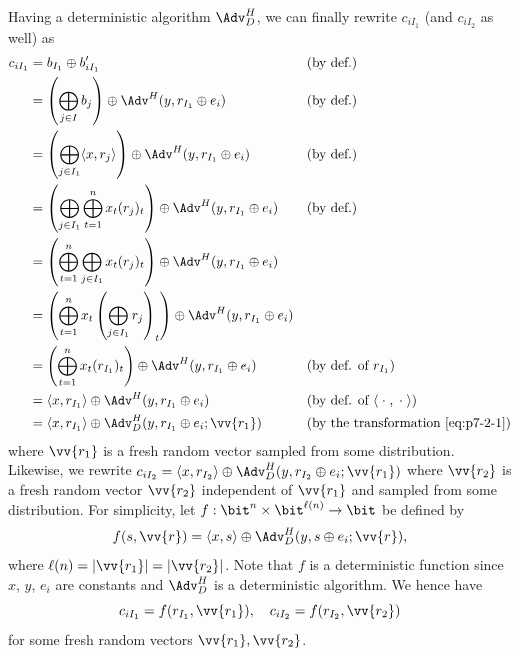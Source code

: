 \begin{answer}[ii]
    Having a deterministic algorithm $\Adv^H_D$, we can finally rewrite  $c_{iI_1}$ (and $c_{iI_2}$ as well) as
    \begin{align*}
        c_{iI_1} 
        &= b_{I_1} \oplus b'_{iI_1} && \textrm{(by def.)}\\
        &= \left(\bigoplus_{j\in I} b_j \right) \oplus \Adv^H(y, r_{I_1} \oplus e_i) && \textrm{(by def.)}\\
        &= \left(\bigoplus_{j\in I_1} \langle x, r_j\rangle \right) \oplus \Adv^H(y, r_{I_1} \oplus e_i) && \textrm{(by def.)}\\
        &= \left(\bigoplus_{j\in I_1} \bigoplus_{t=1}^n x_t(r_j)_t \right) \oplus \Adv^H(y, r_{I_1} \oplus e_i) && \textrm{(by def.)}\\
        &= \left(\bigoplus_{t=1}^n \bigoplus_{j\in I_1}  x_t (r_j)_t\right) \oplus \Adv^H(y, r_{I_1} \oplus e_i)\\
        &= \left(\bigoplus_{t=1}^n x_t \left(\bigoplus_{j\in I_1} r_j\right)_t\right) \oplus \Adv^H(y, r_{I_1} \oplus e_i)\\
        &= \left(\bigoplus_{t=1}^n x_t (r_{I_1})_t\right) \oplus \Adv^H(y, r_{I_1} \oplus e_i) && \textrm{(by def. of $r_{I_1}$)}\\
        &= \langle x, r_{I_1} \rangle \oplus \Adv^H(y, r_{I_1} \oplus e_i) && \textrm{(by def. of $\langle \;\cdot\;, \;\cdot\;\rangle$)}\\
        &= \langle x, r_{I_1} \rangle \oplus \Adv^H_D(y, r_{I_1} \oplus e_i; \vv{r_1}) && \textrm{(by the transformation \eqref{eq:p7-2-1})}
    \end{align*}
    where $\vv{r_1}$ is a fresh random vector sampled from some distribution. Likewise, we rewrite $c_{iI_2} = \langle x, r_{I_2} \rangle \oplus \Adv^H_D(y, r_{I_2} \oplus e_i; \vv{r_1})$ where $\vv{r_2}$ is a fresh random vector $\vv{r_2}$ independent of $\vv{r_1}$ and sampled from some distribution. For simplicity, let $f:\bit^n \times \bit^{\ell(n)} \to\bit$ be defined by
    \[
        f(s, \vv{r}) = \langle x, s \rangle \oplus \Adv^H_D(y, s \oplus e_i; \vv{r}),
    \]
    where $\ell(n)=|\vv{r_1}|=|\vv{r_2}|$. Note that $f$ is a deterministic function since $x$, $y$, $e_i$ are constants and $\Adv^H_D$ is a deterministic algorithm. We hence have
    \begin{equation}\label{eq:p7-2-2}
        c_{iI_1}=f(r_{I_1}, \vv{r_1}),\quad c_{iI_2}=f(r_{I_2}, \vv{r_2})
    \end{equation}
    for some fresh random vectors $\vv{r_1}, \vv{r_2}$.


\end{answer}
